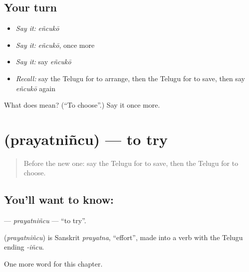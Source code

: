 \subsection*{Your turn}
\begin{itemize}
\raggedright
  \item \emph{Say it:} \emph{eñcukō}
  \item \emph{Say it:} \emph{eñcukō}, once more
  \item \emph{Say it:} say \emph{eñcukō}
  \item \emph{Recall:} say the Telugu for to arrange, then the Telugu for to save, then say \emph{eñcukō} again
\end{itemize}

\begin{tcolorbox}[breakable,colback=teal!4,colframe=teal!35!black,title={Before you move on}]
What does  mean? (\textquotedblleft{}To choose\textquotedblright{}.) Say it once more.
\end{tcolorbox}
\section[\texorpdfstring{\te{ప్రయత్నించు} (prayatniñcu)}{ప్రయత్నించు (prayatniñcu)}]{ (prayatniñcu) — to try}

\label{lesson:TE-C200-prayatnincu}



\begin{quote}
Before the new one: say the Telugu for to save, then the Telugu for to choose.
\end{quote}

\subsection*{You'll want to know: }
\textbf{} — \emph{prayatniñcu} — \textquotedblleft{}to try\textquotedblright{}.

\begin{cousinweb}
\textbf{} (\emph{prayatniñcu}) is Sanskrit \emph{prayatna}, \textquotedblleft{}effort\textquotedblright{}, made into a verb with the Telugu ending \emph{-iñcu}.
\end{cousinweb}

\begin{grammarlens}[title={What you've built}]
One more word for this chapter.
\end{grammarlens}

